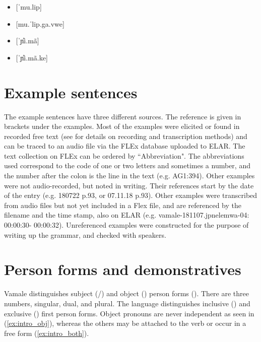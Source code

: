\begin{itemize}
\item {[}ˈmu.lip] 
\item {[}mu.ˈlip.ga.vwe] 
\item {[}ˈɲ̊i.mã] 
\item {[}ˈɲ̊i.mã.ke] 
\end{itemize}

\section{Example sentences}

The example sentences have three different sources. The reference is given in brackets under the examples. Most of the examples were elicited or found in recorded free text (see  for details on recording and transcription methods) and can be traced to an audio file via the FLEx database uploaded to ELAR. The text collection on FLEx can be ordered by ``Abbreviation". The abbreviations used correspond to the code of one or two letters and sometimes a number, and the number after the colon is the line in the text (e.g. AG1:394). Other examples were not audio-recorded, but noted in writing. Their references start by the date of the entry (e.g. 180722 p.93, or 07.11.18 p.93). Other examples were transcribed from audio files but not yet included in a Flex file, and are referenced by the filename and the time stamp, also on ELAR (e.g. vamale-181107.jpnelemwa-04: 00:00:30- 00:00:32). Unreferenced examples were constructed for the purpose of writing up the grammar, and checked with speakers. 

\section{Person forms and demonstratives} 

Vamale distinguishes subject (\slash{}) and object () person forms (). There are three numbers, singular, dual, and plural. The language distinguishes inclusive () and exclusive () first person forms. Object pronouns are never independent as seen in (\ref{ex:intro_obj}), whereas the others may be attached to the verb or occur in a free form (\ref{ex:intro_both}). 

